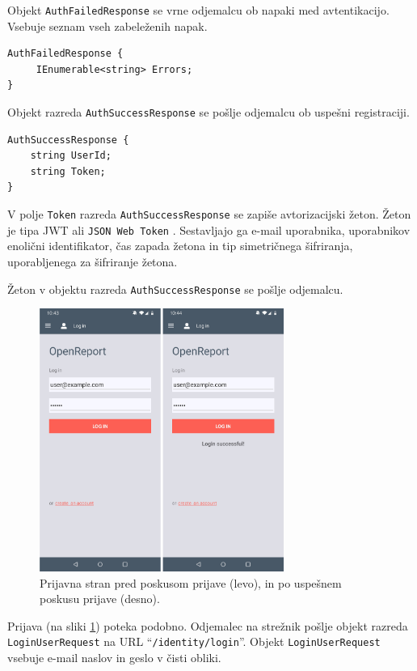 \documentclass[a4paper, 12pt]{book}
\begin{document}
Objekt \texttt{AuthFailedResponse} se vrne odjemalcu ob napaki med avtentikacijo.
Vsebuje seznam vseh zabeleženih napak.

\begin{verbatim}
AuthFailedResponse { 
     IEnumerable<string> Errors; 
}
\end{verbatim}

Objekt razreda \texttt{AuthSuccessResponse} se pošlje odjemalcu ob uspešni registraciji.

\begin{verbatim}
AuthSuccessResponse { 
    string UserId; 
    string Token; 
} 
\end{verbatim}

V polje \texttt{Token} razreda \texttt{AuthSuccessResponse} se zapiše avtorizacijski žeton.
Žeton je tipa JWT ali \texttt{JSON Web Token} \cite{jwtinfo}.
Sestavljajo ga e-mail uporabnika, uporabnikov enolični identifikator, čas zapada žetona in tip simetričnega šifriranja, uporabljenega za šifriranje žetona.

Žeton v objektu razreda \texttt{AuthSuccessResponse} se pošlje odjemalcu.

\clearpage

\begin{figure}[H]
\begin{center}
\includegraphics[width=8cm]{app_login}
\end{center}
	\caption{Prijavna stran pred poskusom prijave (levo), in po uspešnem poskusu prijave (desno).}
\label{app_login}
\end{figure}

Prijava (na sliki \ref{app_login}) poteka podobno.
Odjemalec na strežnik pošlje objekt razreda \texttt{LoginUserRequest} na URL \enquote{\texttt{/identity/login}}.
Objekt \texttt{LoginUserRequest} vsebuje e-mail naslov in geslo v čisti obliki.
\end{document}
